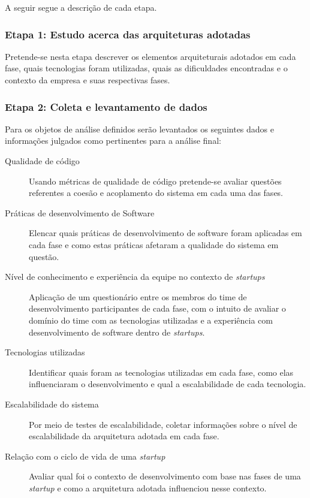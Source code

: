 A seguir segue a descrição de cada etapa.

\subsubsection{Etapa 1: Estudo acerca das arquiteturas adotadas}

Pretende-se nesta etapa descrever os elementos arquiteturais adotados em cada fase,
quais tecnologias foram utilizadas, quais as dificuldades encontradas e o contexto
da empresa e suas respectivas fases.

\subsubsection{Etapa 2: Coleta e levantamento de dados}
\label{sec:Etapa2}

Para os objetos de análise definidos serão levantados os seguintes dados e informações
julgados como pertinentes para a análise final:

    \begin{description}
        \item [Qualidade de código] Usando métricas de qualidade de código pretende-se
        avaliar questões referentes a coesão e acoplamento do sistema em cada uma das
        fases.
        \item [Práticas de desenvolvimento de Software] Elencar quais práticas de
        desenvolvimento de software foram aplicadas em cada fase e como estas práticas
        afetaram a qualidade do sistema em questão.
        \item [Nível de conhecimento e experiência da equipe no contexto de \textit{startups}]
        Aplicação de um questionário entre os membros do time de desenvolvimento participantes
        de cada fase, com o intuito de avaliar o domínio do time com as tecnologias utilizadas
        e a experiência com desenvolvimento de software dentro de \textit{startups}.
        \item [Tecnologias utilizadas] Identificar quais foram as tecnologias utilizadas em
        cada fase, como elas influenciaram o desenvolvimento e qual a escalabilidade de cada
        tecnologia.
        \item [Escalabilidade do sistema] Por meio de testes de escalabilidade, coletar
        informações sobre o nível de escalabilidade da arquitetura adotada em cada fase.
        \item [Relação com o ciclo de vida de uma \textit{startup}] Avaliar qual foi o
        contexto de desenvolvimento com base nas fases de uma \textit{startup} e como a
        arquitetura adotada influenciou nesse contexto.
    \end{description}

